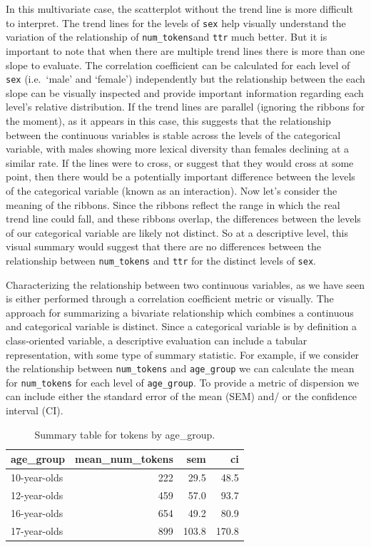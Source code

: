 \documentclass[
  letterpaper,
]{latex/krantz}
\begin{document}
In this multivariate case, the scatterplot without the trend line is
more difficult to interpret. The trend lines for the levels of
\texttt{sex} help visually understand the variation of the relationship
of \texttt{num\_tokens}and \texttt{ttr} much better. But it is important
to note that when there are multiple trend lines there is more than one
slope to evaluate. The correlation coefficient can be calculated for
each level of \texttt{sex} (i.e.~`male' and `female') independently but
the relationship between the each slope can be visually inspected and
provide important information regarding each level's relative
distribution. If the trend lines are parallel (ignoring the ribbons for
the moment), as it appears in this case, this suggests that the
relationship between the continuous variables is stable across the
levels of the categorical variable, with males showing more lexical
diversity than females declining at a similar rate. If the lines were to
cross, or suggest that they would cross at some point, then there would
be a potentially important difference between the levels of the
categorical variable (known as an interaction). Now let's consider the
meaning of the ribbons. Since the ribbons reflect the range in which the
real trend line could fall, and these ribbons overlap, the differences
between the levels of our categorical variable are likely not distinct.
So at a descriptive level, this visual summary would suggest that there
are no differences between the relationship between \texttt{num\_tokens}
and \texttt{ttr} for the distinct levels of \texttt{sex}.

Characterizing the relationship between two continuous variables, as we
have seen is either performed through a correlation coefficient metric
or visually. The approach for summarizing a bivariate relationship which
combines a continuous and categorical variable is distinct. Since a
categorical variable is by definition a class-oriented variable, a
descriptive evaluation can include a tabular representation, with some
type of summary statistic. For example, if we consider the relationship
between \texttt{num\_tokens} and \texttt{age\_group} we can calculate
the mean for \texttt{num\_tokens} for each level of \texttt{age\_group}.
To provide a metric of dispersion we can include either the standard
error of the mean (SEM) and/ or the confidence interval (CI).

\hypertarget{tbl-summarize-bivariate-cont-cat-belc}{}
\begin{table}
\caption{\label{tbl-summarize-bivariate-cont-cat-belc}Summary table for tokens by age\_group. }\tabularnewline

\centering
\begin{tabular}{lrrr}
\toprule
age\_group & mean\_num\_tokens & sem & ci\\
\midrule
10-year-olds & 222 & 29.5 & 48.5\\
12-year-olds & 459 & 57.0 & 93.7\\
16-year-olds & 654 & 49.2 & 80.9\\
17-year-olds & 899 & 103.8 & 170.8\\
\bottomrule
\end{tabular}
\end{table}
\end{document}
